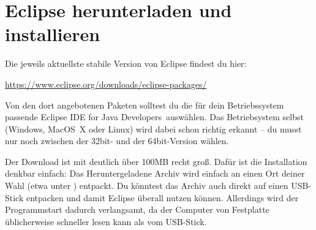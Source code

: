 % 
% 
% 
% 
% 
% 
% 

\clearpage

\section{Eclipse herunterladen und installieren}

Die jeweils aktuellste stabile Version von Eclipse findest du hier:	

\url{https://www.eclipse.org/downloads/eclipse-packages/}

Von den dort angebotenen Paketen solltest du die für dein Betriebssystem
passende \glqq Eclipse IDE for Java Developers\grqq\ auswählen. Das
Betriebsystem selbst (Windows, \mbox{MacOS X} oder Linux) wird dabei schon
richtig erkannt -- du musst nur noch zwischen der 32bit- und der 64bit-Version
wählen.

Der Download ist mit deutlich über 100MB recht groß. Dafür ist die Installation
denkbar einfach: Das Heruntergeladene Archiv wird einfach an einen Ort deiner
Wahl (etwa unter ) entpackt. Du könntest das
Archiv auch direkt auf einen USB-Stick entpacken und damit Eclipse überall
nutzen können. Allerdings wird der Programmstart dadurch verlangsamt, da der
Computer von Festplatte üblicherweise schneller lesen kann als vom USB-Stick.


